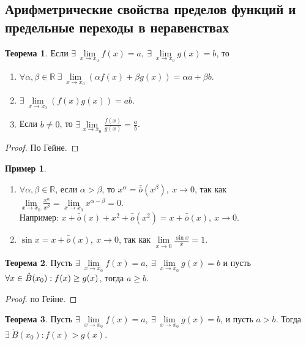 \documentclass[a4paper, 12pt]{article}
\newcommand{\R}{\mathbb{R}}
\newcommand{\Bo}{\mathring{B}}
\newcommand\tab[1][.5cm]{\hspace*{#1}}
\newcommand{\om}{\bar{\bar{o}}}
\theoremstyle{definition}
\newtheorem*{theorem}{Теорема}
\newtheorem*{example}{Пример}
\begin{document}
    \subsection{Арифметрические свойства пределов функций и предельные переходы в неравенствах}
        \begin{theorem}
            Если $\exists\ \lim\limits_{x\to x_0}f(x)=a,\ \exists\ \lim\limits_{x\to x_0}g(x)=b$, то
            \begin{enumerate}
                \item $\forall \alpha,\beta\in \R\ \exists\ \lim\limits_{x\to x_0}(\alpha f(x)+\beta g(x))=\alpha a+\beta b$.
                \item $\exists\ \lim\limits_{x\to x_0}(f(x)g(x))=ab$.
                \item Если $b\ne 0$, то $\exists \lim\limits_{x\to x_0}\frac{f(x)}{g(x)}=\frac{a}{b}$.
            \end{enumerate}
        \end{theorem} 
        \begin{proof}
            По Гейне.
        \end{proof}
        \begin{example}\tab
            \begin{enumerate}
                \item $\forall \alpha,\beta\in \R$, если $\alpha>\beta$, то $x^{\alpha}=\om(x^{\beta}),\ x\to 0$, так как\\
                $\lim\limits_{x\to x_0}\frac{x^{\alpha}}{x^{\beta}}=\lim\limits_{x\to x_0}x^{\alpha-\beta}=0$.\\
                Например: $x+\om(x)+x^2+\om(x^2)=x+\om(x),\ x\to 0$.
                \item $\sin{x}=x+\om(x),\ x\to 0$, так как $\lim\limits_{x\to 0}\frac{\sin{x}}{x}=1$.
            \end{enumerate}
        \end{example}
        \begin{theorem}
            Пусть $\exists\ \lim\limits_{x\to x_0}f(x)=a,\ \exists\ \lim\limits_{x\to x_0}g(x)=b$ и пусть $\forall x\in \Bo(x_0):\\
            f(x)\geq g(x)$, тогда $a\geq b$.
        \end{theorem} 
        \begin{proof}
            по Гейне.
        \end{proof} 
        \begin{theorem}
            Пусть $\exists\ \lim\limits_{x\to x_0}f(x)=a,\ \exists\ \lim\limits_{x\to x_0}g(x)=b$, и пусть $a>b$. Тогда $\exists\ \Bo(x_0): f(x)>g(x)$.
        \end{theorem}
\end{document}
